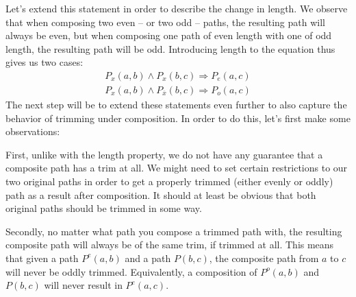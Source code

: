Let's extend this statement in order to describe the change in length.
We observe that when composing two even -- or two odd -- paths, the resulting path will always be even, but when composing one path of even length with one of odd length, the resulting path will be odd.
Introducing length to the equation thus gives us two cases:
\begin{align*}
  P_x(a,b) \wedge P_x(b,c) \Rightarrow P_e(a,c)\\
  P_x(a,b) \wedge P_{\overline{x}}(b,c) \Rightarrow P_o(a,c)
\end{align*}
The next step will be to extend these statements even further to also capture the behavior of trimming under composition.
In order to do this, let's first make some observations:

First, unlike with the length property, we do not have any guarantee that a composite path has a trim at all.
We might need to set certain restrictions to our two original paths in order to get a properly trimmed (either evenly or oddly) path as a result after composition.  It should at least be obvious that both original paths should be trimmed in some way.

Secondly, no matter what path you compose a trimmed path with, the resulting composite path will always be of the same trim, if trimmed at all.
This means that given a path $P^e(a,b)$ and a path $P(b,c)$, the composite path from $a$ to $c$ will never be oddly trimmed. Equivalently, a composition of $P^o(a,b)$ and $P(b,c)$ will never result in $P^e(a,c)$.

